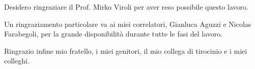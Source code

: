 \backmatter




\begin{acknowledgements} %
%
Desidero ringraziare il Prof. Mirko Viroli per aver reso possibile questo lavoro.

Un ringraziamento particolare va ai miei correlatori, Gianluca Aguzzi e Nicolas Farabegoli, per la grande disponibilità durante tutte le fasi del lavoro.

Ringrazio infine mio fratello, i miei genitori, il mio collega di tirocinio e i miei colleghi.
%
\end{acknowledgements}


